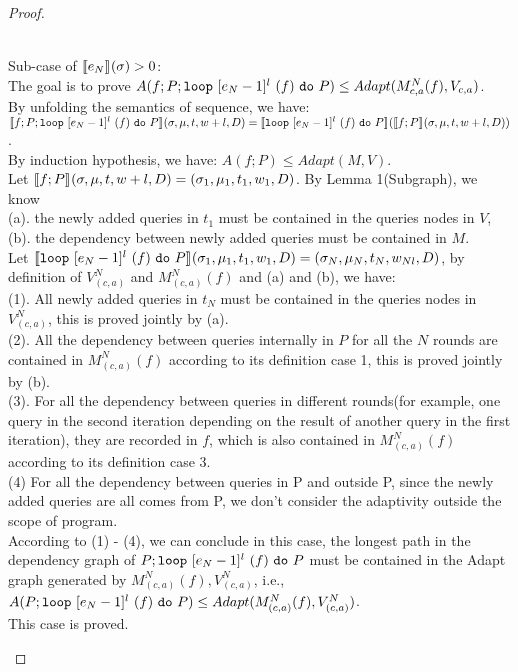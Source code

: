 \documentclass[a4paper,11pt]{article}
\begin{document}
\begin{proof}
\begin{itemize}
\\
Sub-case of $\llbracket e_N\rrbracket_{}(\sigma) > 0$:
\\
The goal is to prove 
$A(f;P; \mathtt{loop} ~ [e_N-1]^{l} ~ (f) ~ \mathtt{do} ~ P) \leq 
Adapt(M_{c,a}^N(f), V_{c, a})$.
\\
By unfolding the semantics of sequence, we have:
\\
$\llbracket f;P; \mathtt{loop} ~ [e_N-1]^{l} ~ (f) ~ \mathtt{do} ~ P \rrbracket_{} (\sigma , \mu, t, w + l, D) 
= \llbracket\mathtt{loop} ~ [e_N-1]^{l} ~ (f) ~ \mathtt{do} ~ P \rrbracket_{ }
(\llbracket f;P\rrbracket_{} (\sigma , \mu, t, w + l, D))$.
\\
By induction hypothesis, we have:
$A(f;P) \leq Adapt(M, V)$.
%
\\
Let $\llbracket f;P\rrbracket_{} (\sigma , \mu, t, w + l, D) 
= (\sigma_1 , \mu_1, t_1, w_1, D)$.  
By Lemma 1(Subgraph),
we know 
\\
(a). the newly added queries in $t_1$ must be contained in the queries nodes in $V$,
\\
(b). the dependency between newly added queries must be contained in $M$.
\\
Let $\llbracket\mathtt{loop} ~ [e_N-1]^{l} ~ (f) ~ \mathtt{do} ~ P \rrbracket_{} (\sigma_1 , \mu_1, t_1, w_1, D) 
= (\sigma_N , \mu_N, t_N, w_{Nl}, D) $, by definition of $V^N_{(c, a)}$ and $M^N_{(c, a)}(f)$ and (a) and (b), we have:
\\
(1). All newly added queries in $t_N$ must be contained in the queries nodes in $V^N_{(c, a)}$, this is proved jointly by (a).
\\
(2). All the dependency between queries internally in $P$ for all the $N$ rounds are contained in $M^N_{(c, a)}(f)$ according to its definition case 1, this is proved jointly by (b).
\\
(3). For all the dependency between queries in different rounds(for example, one query in the second iteration depending on the result of another query in the first iteration), 
they are recorded in $f$,
which is also contained in $M^N_{(c, a)}(f)$ according to its definition case 3.
\\
(4) For all the dependency between queries in P and outside P, since the newly added queries are all comes from P, 
we don't consider the adaptivity outside the scope of program.
\\
According to (1) - (4), we
can conclude in this case, the longest path in the dependency graph of 
$P; \mathtt{loop} ~ [e_N-1]^{l} ~ (f) ~ \mathtt{do} ~ P$ must be contained in the
Adapt graph generated by 
$M^N_{(c, a)}(f), V^N_{(c, a)} $, i.e., 
$A(P; \mathtt{loop} ~ [e_N-1]^{l} ~ (f) ~ \mathtt{do} ~ P) \leq Adapt(M^N_{(c, a)}(f), V^N_{(c, a)} )$.
\\
This case is proved.
%
\end{itemize}
\end{proof}
\end{document}
